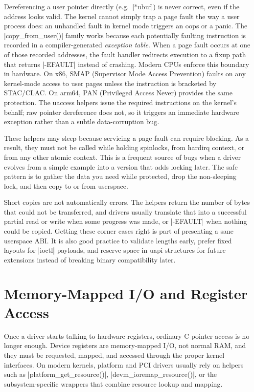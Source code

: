 \documentclass[10pt, oneside]{book}
\begin{document}
Dereferencing a user pointer directly (e.g.\ \cpp|*ubuf|) is never correct, even
if the address looks valid.
The kernel cannot simply trap a page fault the way a user process does: an
unhandled fault in kernel mode triggers an oops or a panic.
The \cpp|copy_from_user()| family works because each potentially faulting
instruction is recorded in a compiler-generated \emph{exception table}.
When a page fault occurs at one of those recorded addresses, the fault handler
redirects execution to a fixup path that returns \cpp|-EFAULT| instead of
crashing.
Modern CPUs enforce this boundary in hardware.
On x86, SMAP (Supervisor Mode Access Prevention) faults on any kernel-mode access to user pages unless the instruction is bracketed by STAC/CLAC.
On arm64, PAN (Privileged Access Never) provides the same protection.
The uaccess helpers issue the required instructions on the kernel's behalf; raw pointer dereference does not, so it triggers an immediate hardware exception rather than a subtle data-corruption bug.

These helpers may sleep because servicing a page fault can require blocking.
As a result, they must not be called while holding spinlocks, from hardirq
context, or from any other atomic context.
This is a frequent source of bugs when a driver evolves from a simple example
into a version that adds locking later.
The safe pattern is to gather the data you need while protected, drop the
non-sleeping lock, and then copy to or from userspace.

Short copies are not automatically errors.
The helpers return the number of bytes that could not be transferred, and
drivers usually translate that into a successful partial read or write when some
progress was made, or \cpp|-EFAULT| when nothing could be copied.
Getting these corner cases right is part of presenting a sane userspace ABI.
It is also good practice to validate lengths early, prefer fixed layouts for
\cpp|ioctl| payloads, and reserve space in uapi structures for future
extensions instead of breaking binary compatibility later.

\section{Memory-Mapped I/O and Register Access}
\label{sec:mmio}
Once a driver starts talking to hardware registers, ordinary C pointer access is
no longer enough.
Device registers are memory-mapped I/O, not normal RAM, and they must be
requested, mapped, and accessed through the proper kernel interfaces.
On modern kernels, platform and PCI drivers usually rely on helpers such as
\cpp|platform_get_resource()|, \cpp|devm_ioremap_resource()|, or the
subsystem-specific wrappers that combine resource lookup and mapping.
\end{document}
